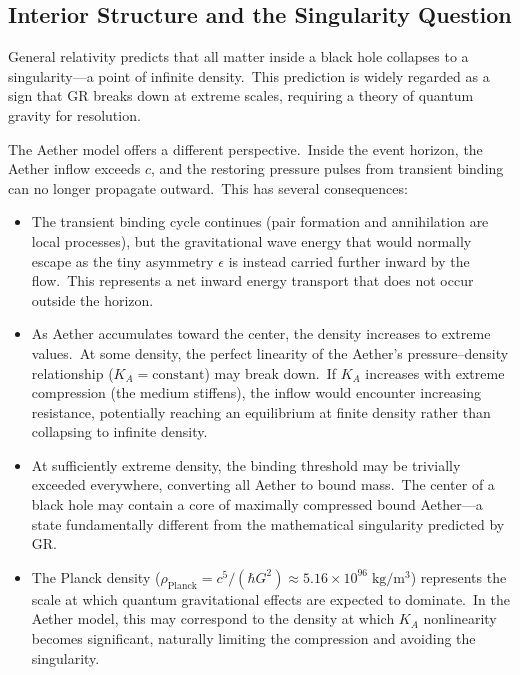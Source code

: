 ﻿\documentclass[12pt,letterpaper]{article}
\newcommand{\Ka}{K_{\!A}}
\begin{document}
\subsection{Interior Structure and the Singularity Question}

General relativity predicts that all matter inside a black hole collapses to a singularity---a point of infinite density.\ This prediction is widely regarded as a sign that GR
breaks down at extreme scales, requiring a theory of quantum gravity for resolution.

The Aether model offers a different perspective.\ Inside the event horizon, the Aether
inflow exceeds $c$, and the restoring pressure pulses from transient binding can no longer
propagate outward.\ This has several consequences:

\begin{itemize}[leftmargin=2em]
  \item The transient binding cycle continues (pair formation and annihilation are local
    processes), but the gravitational wave energy that would normally escape as the tiny
    asymmetry $\epsilon$ is instead carried further inward by the flow.\ This represents a net
    inward energy transport that does not occur outside the horizon.

  \item As Aether accumulates toward the center, the density increases to extreme values.\ At
    some density, the perfect linearity of the Aether's pressure--density relationship
    ($\Ka = \text{constant}$) may break down.\ If $\Ka$ increases with extreme compression (the
    medium stiffens), the inflow would encounter increasing resistance, potentially
    reaching an equilibrium at finite density rather than collapsing to infinite density.

  \item At sufficiently extreme density, the binding threshold may be trivially exceeded
    everywhere, converting all Aether to bound mass.\ The center of a black hole may
    contain a core of maximally compressed bound Aether---a state fundamentally different
    from the mathematical singularity predicted by GR.

  \item The Planck density ($\rho_{\mathrm{Planck}} = c^5 / (\hbar G^2) \approx 5.16 \times 10^{96}\;\mathrm{kg/m^3}$)
    represents the scale at which quantum gravitational effects are expected
    to dominate.\ In the Aether model, this may correspond to the density at which $\Ka$
    nonlinearity becomes significant, naturally limiting the compression and avoiding
    the singularity.
\end{itemize}
\end{document}
